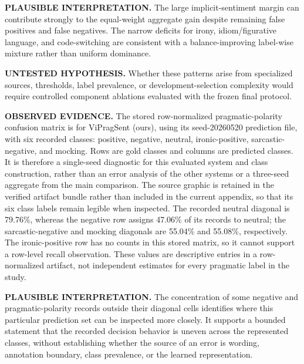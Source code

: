 \textbf{PLAUSIBLE INTERPRETATION.} The large implicit-sentiment margin can contribute strongly to the equal-weight aggregate gain despite remaining false positives and false negatives. The narrow deficits for irony, idiom/figurative language, and code-switching are consistent with a balance-improving label-wise mixture rather than uniform dominance.

\textbf{UNTESTED HYPOTHESIS.} Whether these patterns arise from specialized sources, thresholds, label prevalence, or development-selection complexity would require controlled component ablations evaluated with the frozen final protocol.

\textbf{OBSERVED EVIDENCE.} The stored row-normalized pragmatic-polarity confusion matrix is for ViPragSent (ours), using its seed-20260520 prediction file, with six recorded classes: positive, negative, neutral, ironic-positive, sarcastic-negative, and mocking.  Rows are gold classes and columns are predicted classes.  It is therefore a single-seed diagnostic for this evaluated system and class construction, rather than an error analysis of the other systems or a three-seed aggregate from the main comparison.  The source graphic is retained in the verified artifact bundle rather than included in the current appendix, so that its six class labels remain legible when inspected.
The recorded neutral diagonal is 79.76\%, whereas the negative row assigns 47.06\% of its records to neutral; the sarcastic-negative and mocking diagonals are 55.04\% and 55.08\%, respectively.
The ironic-positive row has no counts in this stored matrix, so it cannot support a row-level recall observation.  These values are descriptive entries in a row-normalized artifact, not independent estimates for every pragmatic label in the study.

\textbf{PLAUSIBLE INTERPRETATION.} The concentration of some negative and pragmatic-polarity records outside their diagonal cells identifies where this particular prediction set can be inspected more closely.  It supports a bounded statement that the recorded decision behavior is uneven across the represented classes, without establishing whether the source of an error is wording, annotation boundary, class prevalence, or the learned representation.

